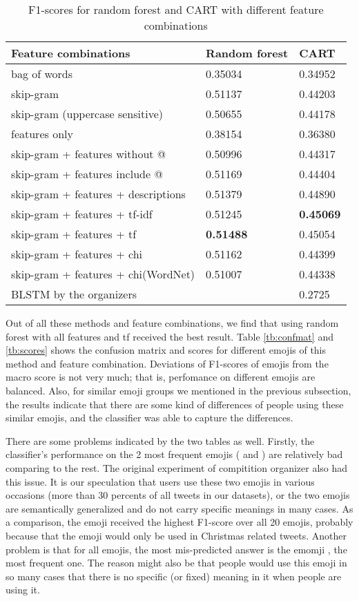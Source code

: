 \documentclass[english, table, latin9]{article}
\begin{document}
\begin{table}[t]
\caption{F1-scores for random forest and CART with different feature combinations}
\label{tb:detailed}
\centering
\begin{tabularx}{350pt}{l|XX}
	\toprule
		\textbf{Feature combinations} & \textbf{Random forest} & \textbf{CART} \\
	\midrule
		bag of words & 0.35034 & 0.34952 \\
		skip-gram & 0.51137 & 0.44203 \\
		skip-gram (uppercase sensitive) & 0.50655 & 0.44178 \\
	\midrule
		features only & 0.38154 & 0.36380 \\
		skip-gram + features without @ & 0.50996 & 0.44317 \\
		skip-gram + features include @ & 0.51169 & 0.44404 \\ 
	\midrule
		skip-gram + features + descriptions & 0.51379 & 0.44890 \\
		skip-gram + features + tf-idf & 0.51245 & \textbf{0.45069} \\
		skip-gram + features + tf & \textbf{0.51488} & 0.45054 \\
		skip-gram + features + chi & 0.51162 & 0.44399 \\
		skip-gram + features + chi(WordNet) & 0.51007 & 0.44338 \\
	\midrule
		BLSTM by the organizers & & 0.2725 \\
	\bottomrule
\end{tabularx}
\end{table}

\par Out of all these methods and feature combinations, we find that using random forest with all features and tf received the best result. Table \ref{tb:confmat} and \ref{tb:scores} shows the confusion matrix and scores for different emojis of this method and feature combination. Deviations of F1-scores of emojis from the macro score is not very much; that is, perfomance on different emojis are balanced. Also, for similar emoji groups we mentioned in the previous subsection, the results indicate that there are some kind of differences of people using these similar emojis, and the classifier was able to capture the differences.
\par There are some problems indicated by the two tables as well. Firstly, the classifier's performance on the 2 most frequent emojis ( and ) are relatively bad comparing to the rest. The original experiment of compitition organizer\cite{bib4} also had this issue. It is our speculation that users use these two emojis in various occasions (more than 30 percents of all tweets in our datasets), or the two emojis are semantically generalized and do not carry specific meanings in many cases. As a comparison, the emoji  received the highest F1-score over all 20 emojis, probably because that the emoji would only be used in Christmas related tweets. Another problem is that for all emojis, the most mis-predicted answer is the emomji , the most frequent one. The reason might also be that people would use this emoji in so many cases that there is no specific (or fixed) meaning in it when people are using it.
\end{document}
